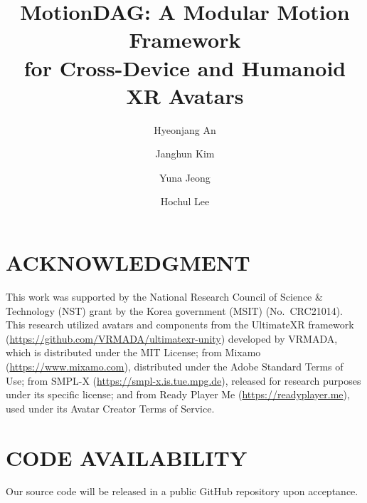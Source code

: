 \documentclass{IEEEcsmag}
\begin{document}
\title{MotionDAG: A Modular Motion Framework\\ for Cross-Device and Humanoid XR Avatars}

\author{Hyeonjang An}

\author{Janghun Kim}

\author{Yuna Jeong}

\author{Hochul Lee}


\begin{abstract}

\end{abstract}

\maketitle









\section{ACKNOWLEDGMENT}
This work was supported by the National Research Council of Science \& Technology (NST) grant by the Korea government (MSIT) (No.\ CRC21014). 
This research utilized avatars and components from the UltimateXR framework (\url{https://github.com/VRMADA/ultimatexr-unity}) developed by VRMADA, which is distributed under the MIT License; from Mixamo (\url{https://www.mixamo.com}), distributed under the Adobe Standard Terms of Use; from SMPL-X (\url{https://smpl-x.is.tue.mpg.de}), released for research purposes under its specific license; and from Ready Player Me (\url{https://readyplayer.me}), used under its Avatar Creator Terms of Service.

\section{CODE AVAILABILITY}
Our source code will be released in a public GitHub repository upon acceptance.



\end{document}
